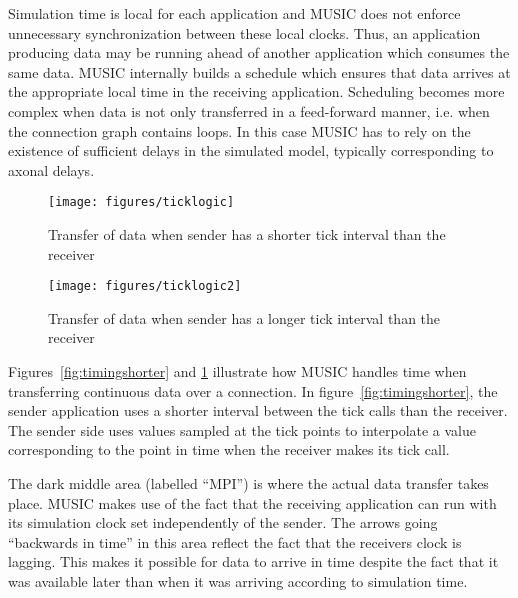 \documentclass[a4paper,twoside]{report}
\begin{document}
Simulation time is local for each application
and MUSIC does not enforce unnecessary synchronization between these
local clocks.  Thus, an application producing data may be running
ahead of another application which consumes the same data.  MUSIC
internally builds a schedule which ensures that data arrives at the
appropriate local time in the receiving application.  Scheduling
becomes more complex when data is not only transferred in a
feed-forward manner, i.e. when the connection graph contains loops.
In this case MUSIC has to rely on the existence of sufficient delays
in the simulated model, typically corresponding to axonal
delays.

\begin{figure}
  \begin{center}
    \begin{minipage}{0.45\textwidth}
      \texttt{[image: figures/ticklogic]}
      \caption[Timing of data transfer, slowdown]{\label{fig:timingshorter}
        Transfer of data when sender has a shorter
        tick interval than the receiver}
    \end{minipage}
    \hfill
    \begin{minipage}{0.45\textwidth}
      \texttt{[image: figures/ticklogic2]}
      \caption[Timing of data transfer, speedup]{\label{fig:timinglonger}
        Transfer of data when sender has a longer
        tick interval than the receiver}
    \end{minipage}
  \end{center}
\end{figure}

Figures~\ref{fig:timingshorter} and \ref{fig:timinglonger} illustrate
how MUSIC handles time when transferring continuous data over a connection.
In figure~\ref{fig:timingshorter}, the sender application uses a
shorter interval between the tick calls than the receiver.  The sender
side uses values sampled at the tick points to interpolate a value
corresponding to the point in time when the receiver makes its tick
call.

The dark middle area (labelled ``MPI'') is where the actual data
transfer takes place.  MUSIC makes use of the fact that the receiving
application can run with its simulation clock set independently of the
sender.  The arrows going ``backwards in time'' in this area reflect
the fact that the receivers clock is lagging.  This makes it possible
for data to arrive in time despite the fact that it was available
later than when it was arriving according to simulation time.
\end{document}
